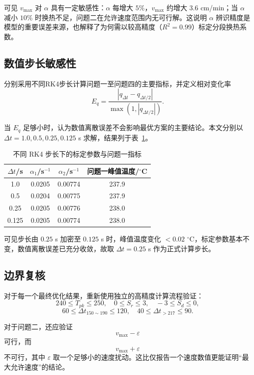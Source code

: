 \documentclass{cumcmthesis}
\begin{document}
可见 $v_{\max}$ 对 $\alpha$ 具有一定敏感性：$\alpha$ 每增大 $5\%$，$v_{\max}$ 约增大 $3.6$ cm/min；当 $\alpha$ 减小 $10\%$ 时换热不足，问题二在允许速度范围内无可行解。这说明 $\alpha$ 辨识精度是模型的重要误差来源，也解释了为何需以较高精度（$R^2=0.99$）标定分段换热系数。

\subsection{数值步长敏感性}

分别采用不同RK4步长计算问题一至问题四的主要指标，并定义相对变化率
\begin{equation}
E_q
=
\frac{|q_{\Delta t}-q_{\Delta t/2}|}
{\max(1,|q_{\Delta t/2}|)}.
\end{equation}

当 $E_q$ 足够小时，认为数值离散误差不会影响最优方案的主要结论。本文分别以 $\Delta t=1.0,0.5,0.25,0.125$ s 求解，结果列于表~\ref{tab:sens_dt}。

\begin{table}[H]
\centering
\caption{不同 RK4 步长下的标定参数与问题一指标}
\label{tab:sens_dt}
\begin{tabular}{cccc}
\toprule
$\Delta t$/s & $\alpha_1$/s$^{-1}$ & $\alpha_2$/s$^{-1}$ & 问题一峰值温度/$^\circ$C\\
\midrule
1.0 & 0.0205 & 0.00774 & 237.9\\
0.5 & 0.0204 & 0.00775 & 237.9\\
0.25 & 0.0205 & 0.00776 & 238.0\\
0.125 & 0.0205 & 0.00774 & 238.0\\
\bottomrule
\end{tabular}
\end{table}

可见步长由 $0.25$ s 加密至 $0.125$ s 时，峰值温度变化 $<0.02$ $^\circ$C，标定参数基本不变，数值离散误差已充分收敛，故取 $\Delta t=0.25$ s 作为正式计算步长。

\subsection{边界复核}

对于每一个最终优化结果，重新使用独立的高精度计算流程验证：
\[
240\le T_{pk}\le250,
\quad
0\le S_r\le3,
\quad
-3\le S_d\le0,
\]
\[
60\le\Delta t_{150\sim190}\le120,
\quad
40\le\Delta t_{>217}\le90.
\]

对于问题二，还应验证
\[
v_{\max}-\varepsilon
\]
可行，而
\[
v_{\max}+\varepsilon
\]
不可行，其中 $\varepsilon$ 取一个足够小的速度扰动。这比仅报告一个速度数值更能证明“最大允许速度”的结论。
\end{document}
